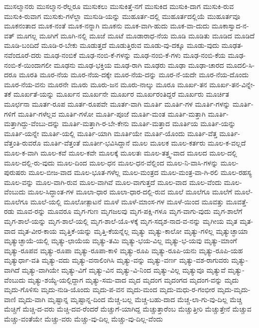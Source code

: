 {ಮುಸಲ್ಮಾನರು
ಮುಸಲ್ಮಾನ-ರೆಲ್ಲರೂ
ಮುಸುಕಲು
ಮುಸುಕಿತ್ತೆ-ನಗೆ
ಮುಸುಕಿದ
ಮುಸುಕಿ-ದಾಗ
ಮುಸುಕಿ-ರುವ
ಮುಸುಕಿ-ರುವಾಗ
ಮುಸುಕು-ಗಳೆಲ್ಲಾ
ಮುಸುಡಿ-ಯನ್ನು
ಮುಹೂರ್ತ-ದಲ್ಲಿ
ಮುಹೂರ್ತದಲ್ಲಿಯೆ
ಮುಹೂರ್ತವೂ
ಮೂಕನಂತಾದ
ಮೂಕ-ನಂತೆ
ಮೂಕ-ನನ್ನಾಗಿ
ಮೂಕನು
ಮೂಕ-ವಾಗಿ-ಹುದು
ಮೂಕ-ವಾ-ದುದು
ಮೂಕಾಸ್ವಾದ-ನ-ವತ್
ಮೂಗಲ್ಲ
ಮೂಗಿಗೆ
ಮೂಗಿ-ನಲ್ಲಿ
ಮೂಜೆ
ಮೂಟೆ
ಮೂಡಾರಾಧ-ನೆಯ
ಮೂಡಿ
ಮೂಡಿತು
ಮೂಡಿದ
ಮೂಡಿದೆ
ಮೂಡಿ-ಬಂದಿದೆ
ಮೂಡಿ-ರ-ಬೇಕು
ಮೂಡುತ್ತದೆ
ಮೂಡುತ್ತಿರುವ
ಮೂಡು-ವು-ದಕ್ಕೂ
ಮೂಡು-ವುದು
ಮೂಢತ-ನವೆಂದೂರೆ-ದರು
ಮೂಢ-ನಂಬಿಕೆ
ಮೂಢ-ನಂಬಿ-ಕೆ-ಗಳನ್ನು
ಮೂಢ-ನಂಬಿ-ಕೆ-ಗಳು
ಮೂಢ-ನಂಬಿ-ಕೆಯ
ಮೂಢ-ನಂಬಿ-ಕೆ-ಯಿಂದಾಗಲೀ
ಮೂಢನು
ಮೂಢ-ಭಕ್ತಿಯ
ಮೂಢ-ರಾಗಿ
ಮೂಢರು
ಮೂಢಾ
ಮೂಢಾ-ಚಾರದ
ಮೂದಲಿ-ಸಿ-ದರೂ
ಮೂರತಿ
ಮೂರ-ನೆಯ
ಮೂರ-ನೆಯ-ದಕ್ಕೇ
ಮೂರ-ನೆಯ-ದನ್ನು
ಮೂರ-ನೆ-ಯದೇ
ಮೂರ-ನೆಯ-ದೊಂದು
ಮೂರ-ನೆಯ-ವನು
ಮೂರನೇ
ಮೂರು
ಮೂರು-ಜನ
ಮೂರು-ನಾಲ್ಕು
ಮೂರೂ
ಮೂರ್ಖ-ತನ
ಮೂರ್ಖ-ತನ-ವಿನ್ನೇ-ತಕೆ
ಮೂರ್ಖತೆ-ಯನ್ನು
ಮೂರ್ಖನ
ಮೂರ್ಖನೇ
ಮೂರ್ಖರ
ಮೂರ್ಖರಂತಿದ್ದರೆ
ಮೂರ್ಖರು
ಮೂರ್ಚಿತ
ಮೂರ್ಛನಾ
ಮೂರ್ತ-ರೂಪ
ಮೂರ್ತ-ರೂಪವೇ
ಮೂರ್ತ-ವಾಗಿ
ಮೂರ್ತಿ
ಮೂರ್ತಿ-ಗಳ
ಮೂರ್ತಿ-ಗಳನ್ನು
ಮೂರ್ತಿ-ಗಳಿಗೆ
ಮೂರ್ತಿ-ಗಳೆಲ್ಲವ
ಮೂರ್ತಿ-ಗಳೋ
ಮೂರ್ತಿ-ಪೂಜೆ
ಮೂರ್ತಿ-ಮಂತ
ಮೂರ್ತಿ-ಮತ್ತಾಗಿ
ಮೂರ್ತಿ-ಮತ್ತಾಗಿದ್ದು-ವೆಂಬು-ದನ್ನು
ಮೂರ್ತಿ-ಮತ್ತಾಗಿ-ರ-ಬೇ-ಕೇನು
ಮೂರ್ತಿ-ಮತ್ತಾದ
ಮೂರ್ತಿಯ
ಮೂರ್ತಿ-ಯನ್ನು
ಮೂರ್ತಿ-ಯನ್ನೇ
ಮೂರ್ತಿ-ಯಲ್ಲಿ
ಮೂರ್ತಿ-ಯಾಗಿ
ಮೂರ್ತಿಯೇ
ಮೂರ್ತಿ-ಯೊಂದು
ಮೂರ್ತಿ-ವೆತ್ತ
ಮೂರ್ತಿ-ವೆತ್ತಂತಿ-ರುವರೊ
ಮೂರ್ತಿ-ವೆತ್ತಂತೆ
ಮೂರ್ತೀ-ಭವಿಸಿದ್ದಾನೆ
ಮೂಲ
ಮೂಲಕ
ಮೂಲ-ಕರ್ತರು
ಮೂಲ-ಕ-ವಲ್ಲದೆ
ಮೂಲ-ಕ-ವಾಗಿ
ಮೂಲ-ಕವೆ
ಮೂಲ-ಕವೇ
ಮೂಲಕ್ಕೆ
ಮೂಲತಃ
ಮೂಲ-ತತ್ತ್ವ-ವಾದ
ಮೂಲದ
ಮೂಲ-ದಲ್ಲಿ
ಮೂಲ-ದಲ್ಲಿ-ರು-ವುದು
ಮೂಲ-ದಿಂದ
ಮೂಲ-ಧನ
ಮೂಲ-ಧನ-ವೆಲ್ಲಿಂದ
ಮೂಲ-ನಿ-ವಾಸಿ-ಗಳನ್ನು
ಮೂಲ-ಪುರುಷರು
ಮೂಲ-ಬೀಜ-ವಾದ
ಮೂಲ-ಭೂತ-ಗಳೆಲ್ಲ
ಮೂಲ-ಮಂತ್ರದ
ಮೂಲ-ಮಂತ್ರ-ವಾ-ಗಿ-ರಲಿ
ಮೂಲ-ರಹಸ್ಯ
ಮೂಲ-ವನ್ನು
ಮೂಲ-ವಾಗಿ-ರುವ
ಮೂಲ-ವಾಗಿವೆ
ಮೂಲ-ವಾಗುತ್ತದೆ
ಮೂಲ-ವಾದ
ಮೂಲ-ವೆಂದು
ಮೂಲ-ವೆಂಬುದು
ಮೂಲ-ಸಿದ್ಧಾಂತ-ಗಳ
ಮೂಲಾ-ಧಾರ
ಮೂಲಾ-ಧಾರ-ದಲ್ಲಿ-ರುವ
ಮೂಲೆ
ಮೂಲೆಗೂ
ಮೂಲೆಗೆ
ಮೂಲೆ-ಮೂಲೆಗೂ
ಮೂಲೆ-ಯಲ್ಲಿ
ಮೂಲೋತ್ಪಾಟನೆ
ಮೂಳೆ
ಮೂಳೆ-ಮಾಂಸ-ಗಳ
ಮೂಳೆ-ಯಿಂದ
ಮೂವತ್ತು
ಮೂವತ್ತೆ-ರಡು
ಮೂವ-ರನ್ನು
ಮೂವರೂ
ಮೃಗ-ಗುಣ
ಮೃಗಜಲವು
ಮೃಗ-ಪಕ್ಷಿ-ಗಳೂ
ಮೃಗ-ವಾಗು-ವುದು
ಮೃಗ-ಶಾಲೆಗೆ
ಮೃಗ-ಶಾಲೆ-ಯನ್ನು
ಮೃಗ-ಶಾಲೆ-ಯಲ್ಲಿ
ಮೃಗ-ಶಾಲೆ-ಯೊ-ಳಕ್ಕೆ
ಮೃಗ-ಸದೃಶ-ನಾದ-ವ-ನನ್ನು
ಮೃಗೀಯ
ಮೃತ
ಮೃತ-ವಾದ
ಮೃತ-ವೀರ-ಕಾಯ
ಮೃತ್ತಿಕೆ-ಯನ್ನು
ಮೃತ್ತಿ-ಕೆಯನ್ನೆಲ್ಲ
ಮೃತ್ಯು
ಮೃತ್ಯು-ಕಾಲೋ
ಮೃತ್ಯು-ಗಳಿಲ್ಲ
ಮೃತ್ಯುಚ್ಛಾಯಾ
ಮೃತ್ಯುಚ್ಛಾಯೆ-ಯಲ್ಲಿ
ಮೃತ್ಯು-ಛಾಯೆಯ
ಮೃತ್ಯು-ತಮಿ
ಮೃತ್ಯು-ಭಯ-ವಿಲ್ಲ
ಮೃತ್ಯು-ಭ-ಯವು
ಮೃತ್ಯು-ಮಾಂಗೆ
ಮೃತ್ಯು-ರೂಪವ
ಮೃತ್ಯು-ರೂಪಾ
ಮೃತ್ಯು-ರೂಪಾ-ಕಾಳಿ
ಮೃತ್ಯು-ರೂಪಿ
ಮೃತ್ಯು-ರೂಪಿ-ಯನು
ಮೃತ್ಯು-ರೂಪಿ-ಯಹ
ಮೃತ್ಯುರ್ಧಾ-ವತಿ
ಮೃತ್ಯು-ವದು
ಮೃತ್ಯು-ವನಾಲಿಂಗಿಸಿ
ಮೃತ್ಯು-ವನ್ನು
ಮೃತ್ಯು-ವರ್ಣ
ಮೃತ್ಯು-ವಶ-ರಾಗುವರು
ಮೃತ್ಯು-ವಾಗಿದೆ
ಮೃತ್ಯು-ವಾಗಿಯೇ
ಮೃತ್ಯು-ವಿಗೆ
ಮೃತ್ಯು-ವಿನ
ಮೃತ್ಯು-ವಿ-ನಿಂದ
ಮೃತ್ಯು-ವಿಲ್ಲ
ಮೃತ್ಯುವೂ
ಮೃತ್ಯುವೆ
ಮೃತ್ಯು-ವೆಂಬುದು
ಮೃತ್ಯು-ಶಯ್ಯೆ-ಯಲ್ಲಿದ್ದಾಗ
ಮೃತ್ಯು-ಸಮ-ವಾದ
ಮೃದ
ಮೃದಂಗ
ಮೃದಂಗದ
ಮೃದಂಗ-ವನ್ನು
ಮೃದು
ಮೃದು-ಗೊಳಿಸು
ಮೃದು-ನುಡಿ-ಯೊಂದು
ಮೃದು-ಪ-ವನ
ಮೃದು-ಮಂದ
ಮೃದು-ಮಧು-ರ-ಗಂಭೀರ
ಮೃದು-ಮೃದು-ವಾಣಿ
ಮೃದು-ವಾಗಿ
ಮೃಷ್ಟಾನ್ನ
ಮೃಷ್ಟಾನ್ನ-ದಿಂದ
ಮೆಚ್ಚ-ಬಲ್ಲ
ಮೆಚ್ಚ-ಬಹು-ದಾದ
ಮೆಚ್ಚ-ಲಾ-ಗು-ವು-ದಿಲ್ಲ
ಮೆಚ್ಚಿ
ಮೆಚ್ಚಿಗೆ
ಮೆಚ್ಚಿ-ದ-ವರು
ಮೆಚ್ಚಿ-ದವ-ರೆಂದರೆ
ಮೆಚ್ಚುಗೆ-ಯಾಗಿದ್ದ
ಮೆಚ್ಚುತ್ತಾರೆಂಬ
ಮೆಚ್ಚುತ್ತೀರಿ
ಮೆಚ್ಚುತ್ತೇನೆ
ಮೆಚ್ಚುವ
ಮೆಚ್ಚು-ವಂತೆಯೇ
ಮೆಚ್ಚು-ವರು
ಮೆಚ್ಚು-ವು-ದಿಲ್ಲ
ಮೆಚ್ಚು-ವು-ದಿಲ್ಲ-ವೆಂದು
}
